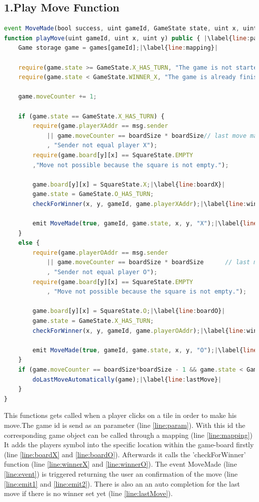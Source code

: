 \subsection{1.Play Move Function\\}
	\begin{lstlisting}[language=JavaScript,escapechar=|]
event MoveMade(bool success, uint gameId, GameState state, uint x, uint y, string symbol);|\label{line:event}| 
function playMove(uint gameId, uint x, uint y) public { |\label{line:param}| 
	Game storage game = games[gameId];|\label{line:mapping}|
		    
	require(game.state >= GameState.X_HAS_TURN, "The game is not started yet.");
	require(game.state < GameState.WINNER_X, "The game is already finished.");
		    
	game.moveCounter += 1;
		    
	if (game.state == GameState.X_HAS_TURN) {
		require(game.playerXAddr == msg.sender
			|| game.moveCounter == boardSize * boardSize// last move made 	automatically
			, "Sender not equal player X");
		require(game.board[y][x] == SquareState.EMPTY
		,"Move not possible because the square is not empty.");
		    
		game.board[y][x] = SquareState.X;|\label{line:boardX}|
		game.state = GameState.O_HAS_TURN;
		checkForWinner(x, y, gameId, game.playerXAddr);|\label{line:winnerX}|
		    
		emit MoveMade(true, gameId, game.state, x, y, "X");|\label{line:emit1}|
	}
	else {
		require(game.playerOAddr == msg.sender
			|| game.moveCounter == boardSize * boardSize      // last move made automatically
			, "Sender not equal player O");
		require(game.board[y][x] == SquareState.EMPTY
			, "Move not possible because the square is not empty.");
		    
		game.board[y][x] = SquareState.O;|\label{line:boardO}|
		game.state = GameState.X_HAS_TURN;
		checkForWinner(x, y, gameId, game.playerOAddr);|\label{line:winnerO}|
		    
		emit MoveMade(true, gameId, game.state, x, y, "O");|\label{line:emit2}|
	}
	if (game.moveCounter == boardSize*boardSize - 1 && game.state < GameState.WINNER_X) {
		doLastMoveAutomatically(game);|\label{line:lastMove}|
	}
}
\end{lstlisting}

This functions gets called when a player clicks on a tile in order to make his move.The game id is send as an parameter (line \ref{line:param}). With this id the corresponding game object can be called through a mapping (line \ref{line:mapping})  It adds the players symbol into the specific location within the game-board firstly (line \ref{line:boardX} and \ref{line:boardO}). Afterwards it calls the 'checkForWinner' function (line \ref{line:winnerX} and \ref{line:winnerO}). The event MoveMade (line \ref{line:event}) is triggered returning the user an confirmation of the move (line \ref{line:emit1} and \ref{line:emit2}). There is also an an auto completion for the last move if there is no winner set yet (line \ref{line:lastMove}).


